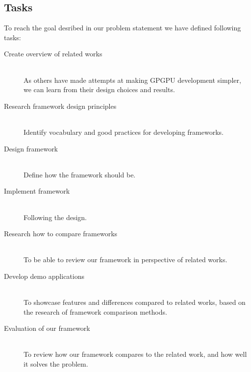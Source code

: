\subsection{Tasks} \label{cha:tasks}
To reach the goal desribed in our problem statement we have defined following tasks:
\begin{description}
\item[Create overview of related works] \hfill \\
As others have made attempts at making GPGPU development simpler, we can learn from their design choices and results.
\item[Research framework design principles] \hfill \\
Identify vocabulary and good practices for developing frameworks.
\item[Design framework] \hfill \\
Define how the framework should be.
\item[Implement framework] \hfill \\
Following the design.
\item[Research how to compare frameworks] \hfill \\
To be able to review our framework in perspective of related works.
\item[Develop demo applications] \hfill \\
To showcase features and differences compared to related works, based on the research of framework comparison methods.
\item[Evaluation of our framework] \hfill \\
To review how our framework compares to the related work, and how well it solves the problem.
\end{description}
